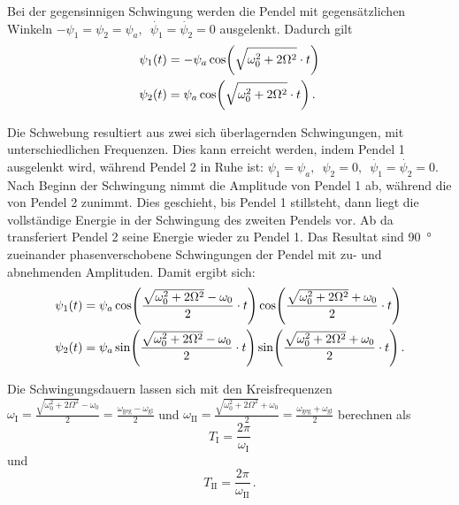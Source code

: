\documentclass[
12pt,
a4paper,
bibliography=totocnumbered, %
BCOR=1cm, %
oneside, %
]{scrartcl}
\begin{document}
Bei der gegensinnigen Schwingung werden die Pendel mit gegensätzlichen Winkeln \(-\psi_1 = \psi_2 = \psi_a, \enspace \dot{\psi_1} = \dot{\psi_2} = 0\) ausgelenkt. Dadurch gilt
\begin{align}
	\psi_1(t) &= -\psi_a \cos\mleft(\sqrt{\omega_0^2+2\Omega^2}\cdot t\mright)\\
	\psi_2(t) &= \psi_a \cos\mleft(\sqrt{\omega_0^2+2\Omega^2}\cdot t\mright) \,.
\end{align}

Die Schwebung resultiert aus zwei sich überlagernden Schwingungen, mit unterschiedlichen Frequenzen. Dies kann erreicht werden, indem Pendel 1 ausgelenkt wird, während Pendel 2 in Ruhe ist: \(\psi_1 = \psi_a, \enspace \psi_2 = 0, \enspace \dot{\psi_1} = \dot{\psi_2} = 0\). Nach Beginn der Schwingung nimmt die Amplitude von Pendel 1 ab, während die von Pendel 2 zunimmt. Dies geschieht, bis Pendel 1 stillsteht, dann liegt die vollständige Energie in der Schwingung des zweiten Pendels vor. Ab da transferiert Pendel 2 seine Energie wieder zu Pendel 1. Das Resultat sind \qty{90}{\degree} zueinander phasenverschobene Schwingungen der Pendel mit zu- und abnehmenden Amplituden. Damit ergibt sich:
\begin{align}
	\psi_1(t) &= \psi_a\cos\mleft(\frac{\sqrt{\omega_0^2+2\Omega^2}-\omega_0}{2} \cdot t\mright)\cos\mleft(\frac{\sqrt{\omega_0^2+2\Omega^2}+\omega_0}{2} \cdot t\mright)\\
	\psi_2(t) &= \psi_a\sin\mleft(\frac{\sqrt{\omega_0^2+2\Omega^2}-\omega_0}{2} \cdot t\mright) \sin\mleft(\frac{\sqrt{\omega_0^2+2\Omega^2}+\omega_0}{2} \cdot t\mright) \,.
\end{align}

Die Schwingungsdauern lassen sich mit den Kreisfrequenzen \(\omega_{\text{I}} = \frac{\sqrt{\omega_0^2 + 2\Omega^2} - \omega_0}{2} = \frac{\omega_{\text{geg}} - \omega_{\text{gl}}}{2}\) und \(\omega_{\text{II}} = \frac{\sqrt{\omega_0^2 + 2\Omega^2} + \omega_0}{2} = \frac{\omega_{\text{geg}} + \omega_{\text{gl}}}{2}\) berechnen als
\begin{equation}\label{eq:t1}
	T_{\text{I}} = \frac{2\pi}{\omega_{\text{I}}}
\end{equation}
und
\begin{equation}\label{eq:t2}
	T_{\text{II}} = \frac{2\pi}{\omega_{\text{II}}} \,.
\end{equation}
\end{document}
